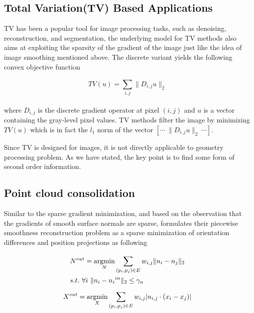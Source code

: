 \subsection{Total Variation(TV) Based Applications}
\label{subsec:TV Applications}

TV has been a popular tool for image processing tasks, such as denoising, reconstruction, and segmentation\cite{chambolle2010introduction}, the underlying model for TV methods also aims at exploiting the sparsity of the gradient of the image just like the idea of image smoothing\cite{xu2011image} mentioned above. The discrete variant yields the following convex objective function

\small{
\begin{equation}
 \label{eq:descreteTV}
 TV(u)=\sum_{i,j}^{}\|D_{i,j}u\|_2
\end{equation}
}
\\
where $D_{i,j}$ is the discrete gradient operator at pixel $(i,j)$ and $u$ is a vector containing the gray-level pixel values. TV methods filter the image by minimizing $TV(u)$ which is in fact the $l_1$ norm of the vector $[\cdots~\|D_{i,j}u\|_2~\cdots]$.

Since TV is designed for images, it is not directly applicable to geometry processing problem.
As we have stated, the key point is to find some form of second order information.


\subsection{Point cloud consolidation}
\label{subsec:TVPoint cloud consolidation}

Similar to the sparse gradient minimization, and based on the observation that the gradients of smooth surface normals are sparse,
\cite{avron2010L1} formulates their piecewise smoothness reconstruction problem as a sparse minimization of orientation differences and position projections as following

\small{
\begin{equation}
 \label{eq:TVconsolidation1}
 \begin{aligned}
 &N^{out} =\mathop{\operatorname*{argmin}}_{N} \sum_{(p_{i},p_{j})\in E}^{} w_{i,j}\|n_{i}-n_{j}\|_2\\
 &s.t.~\forall i~\|n_{i}-{n_{i}}^{in}\|_2\le \gamma_{n} 
 \end{aligned}
\end{equation}
}
\small{
\begin{equation}
 \label{eq:TVconsolidation2}
 X^{out} = \mathop{\operatorname*{argmin}}_{X} \sum_{(p_{i},p_{j})\in E}^{} w_{i,j}|n_{i,j}\cdot (x_{i}-x_{j})|
\end{equation}
}

